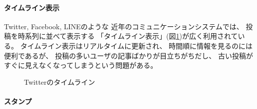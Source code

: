


\vspace{2mm}
\paragraph*{タイムライン表示}

Twitter, Facebook, LINEのような
近年のコミュニケーションシステムでは、
投稿を時系列に並べて表示する
「タイムライン表示」(図\ref{twitter})が広く利用されている。
%
タイムライン表示はリアルタイムに更新され、
時間順に情報を見るのには便利であるが、
投稿の多いユーザの記事ばかりが目立ちがちだし、
古い投稿がすぐに見えなくなってしまうという問題がある。

\begin{figure}[H]
\centering{}
\caption{Twitterのタイムライン}
\label{twitter}
\end{figure}

\vspace{1mm}
\paragraph*{スタンプ}

